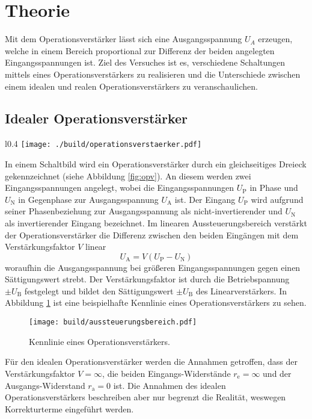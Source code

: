 \section{Theorie}\label{sec:theorie}
Mit dem Operationsverstärker lässt sich eine Ausgangsspannung $U_A$
erzeugen, welche in einem Bereich proportional zur Differenz der beiden
angelegten Eingangsspannungen ist.
Ziel des Versuches ist es, verschiedene Schaltungen mittels eines
Operationsverstärkers zu realisieren und die Unterschiede zwischen einem idealen
und realen Operationsverstärkers zu veranschaulichen.

\subsection{Idealer Operationsverstärker}%
\label{sub:idealer_operationsverstaerker}

\begin{wrapfigure}{l}{0.4\textwidth}
		\centering
		\texttt{[image: ./build/operationsverstaerker.pdf]}
		\caption{Schaltbild eines idealen Operationsverstärkers.
		\cite{anleitung}}
		\label{fig:opv}
\end{wrapfigure}
In einem Schaltbild wird ein Operationsverstärker durch ein gleichseitiges
Dreieck gekennzeichnet (siehe Abbildung \ref{fig:opv}).
An diesem werden zwei Eingangsspannungen angelegt, wobei die
Eingangsspannungen $U_\text{P}$ in Phase
und $U_\text{N}$ in Gegenphase zur Ausgangsspannung
$U_\text{A}$ ist.
Der Eingang $U_\text{P}$ wird aufgrund seiner Phasenbeziehung zur Ausgangsspannung
als nicht-invertierender und $U_\text{N}$ als invertierender Eingang bezeichnet.
Im linearen Aussteuerungsbereich verstärkt der Operationsverstärker die
Differenz zwischen den beiden Eingängen mit dem Verstärkungsfaktor $V$ linear
\begin{equation}
		\label{eq:diff}
		U_\text{A} = V \left( U_\text{P} - U_\text{N} \right)
\end{equation}
woraufhin die Ausgangsspannung bei größeren Eingangsspannungen gegen einen
Sättigungswert strebt.
Der Verstärkungsfaktor ist durch die Betriebspannung $\pm U_\text{B}$ festgelegt
und bildet den Sättigungswert $\pm U_\text{B}$ des Linearverstärkers.
In Abbildung \ref{fig:kennlinie} ist eine beispielhafte Kennlinie eines
Operationsverstärkers zu sehen.
\begin{figure}[h]
		\centering
		\texttt{[image: build/aussteuerungsbereich.pdf]}
		\caption{Kennlinie eines Operationsverstärkers. \cite{anleitung}}
		\label{fig:kennlinie}
\end{figure}
Für den idealen Operationsverstärker werden die Annahmen getroffen, dass der
Verstärkungsfaktor $V = \infty$, die beiden Eingangs-Widerstände $r_\text{e} 
= \infty$ und der Ausgangs-Widerstand $r_\text{a} = 0$ ist.
Die Annahmen des idealen Operationsverstärkers beschreiben aber nur begrenzt
die Realität, weswegen Korrekturterme eingeführt werden.


